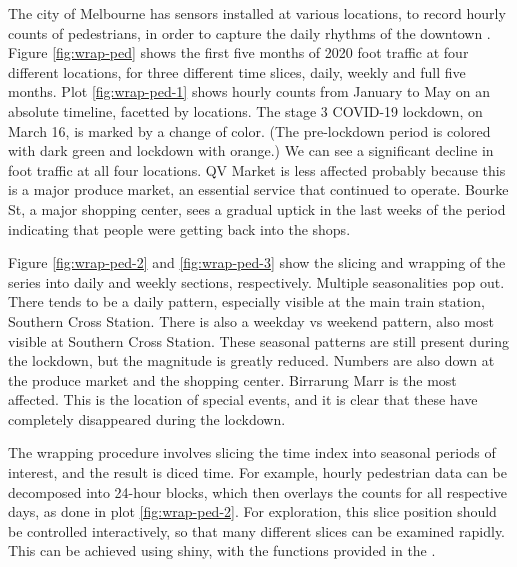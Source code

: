 The city of Melbourne has sensors installed at various locations, to
record hourly counts of pedestrians, in order to capture the daily
rhythms of the downtown \citep{ped}. Figure \ref{fig:wrap-ped} shows the
first five months of 2020 foot traffic at four different locations, for
three different time slices, daily, weekly and full five months. Plot
\ref{fig:wrap-ped-1} shows hourly counts from January to May on an
absolute timeline, facetted by locations. The stage 3 COVID-19 lockdown,
on March 16, is marked by a change of color. (The pre-lockdown period is
colored with dark green and lockdown with orange.) We can see a
significant decline in foot traffic at all four locations. QV Market is
less affected probably because this is a major produce market, an
essential service that continued to operate. Bourke St, a major shopping
center, sees a gradual uptick in the last weeks of the period indicating
that people were getting back into the shops.

Figure \ref{fig:wrap-ped-2} and \ref{fig:wrap-ped-3} show the slicing
and wrapping of the series into daily and weekly sections, respectively.
Multiple seasonalities pop out. There tends to be a daily pattern,
especially visible at the main train station, Southern Cross Station.
There is also a weekday vs weekend pattern, also most visible at
Southern Cross Station. These seasonal patterns are still present during
the lockdown, but the magnitude is greatly reduced. Numbers are also
down at the produce market and the shopping center. Birrarung Marr is
the most affected. This is the location of special events, and it is
clear that these have completely disappeared during the lockdown.

The wrapping procedure involves slicing the time index into seasonal
periods of interest, and the result is diced time. For example, hourly
pedestrian data can be decomposed into 24-hour blocks, which then
overlays the counts for all respective days, as done in plot
\ref{fig:wrap-ped-2}. For exploration, this slice position should be
controlled interactively, so that many different slices can be examined
rapidly. This can be achieved using shiny, with the functions provided
in the .

